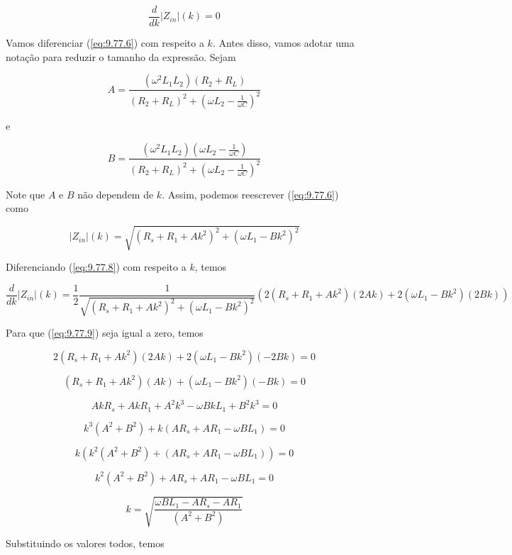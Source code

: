 \documentclass[12pt]{scrartcl}
\begin{document}
    \begin{equation}\label{eq:9.77.7}
        \frac{d}{dk}|Z_{in}|(k) = 0
    \end{equation}

    Vamos diferenciar (\ref{eq:9.77.6}) com respeito a \(k\). Antes disso, vamos adotar uma notação para reduzir o tamanho da expressão.\newline
    Sejam

    \[ A = \frac{(\omega^2L_1L_2)(R_2 + R_L)}{(R_2 + R_L)^2 + (\omega L_2 - \frac{1}{\omega C})^2} \]

    e 

    \[ B = \frac{(\omega^2L_1L_2)(\omega L_2 - \frac{1}{\omega C})}{(R_2 + R_L)^2 + (\omega L_2 - \frac{1}{\omega C})^2} \]

    Note que  \(A\) e \(B\) não dependem de \(k\). Assim, podemos reescrever (\ref{eq:9.77.6}) como

    \begin{equation}\label{eq:9.77.8}
        |Z_{in}|(k) = \sqrt{\left(R_s + R_1 + A k^2\right)^2 + \left(\omega L_1 - B k^2\right)^2}
    \end{equation}

    Diferenciando (\ref{eq:9.77.8}) com respeito a \(k\), temos

    \begin{equation}\label{eq:9.77.9}
         \frac{d}{dk}|Z_{in}|(k) = \frac{1}{2}\frac{1}{\sqrt{\left(R_s + R_1 + A k^2\right)^2 + \left(\omega L_1 - B k^2\right)^2}} \left(2(R_s + R_1 + A k^2)(2Ak) + 2(\omega L_1 - B k^2)(2Bk)\right)
    \end{equation}

    Para que (\ref{eq:9.77.9}) seja igual a zero, temos

    \[ 2(R_s + R_1 + A k^2)(2Ak) + 2(\omega L_1 - B k^2)(-2Bk) = 0 \]

    \[ (R_s + R_1 + A k^2)(Ak) + (\omega L_1 - B k^2)(-Bk) = 0 \]

    \[ AkR_s + AkR_1 + A^2k^3 - \omega BkL_1 + B^2k^3 = 0 \]

    \[ k^3(A^2+B^2) + k(AR_s + AR_1 - \omega BL_1) = 0 \]

    \[ k\left(k^2(A^2+B^2) + (AR_s + AR_1 - \omega BL_1)\right) = 0 \]

    \[ k^2(A^2+B^2) + AR_s + AR_1 - \omega BL_1 = 0 \]

    \[ k = \sqrt{\frac{\omega BL_1 - AR_s - AR_1 }{(A^2+B^2)}} \]

    Substituindo os valores todos, temos
\end{document}
